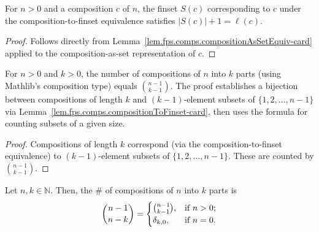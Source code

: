 \begin{lemma}
\label{lem.fps.comps.compositionToFinset-card}
\leanhelper
\leanok
For $n > 0$ and a composition $c$ of $n$, the finset $S(c)$ corresponding to $c$
under the composition-to-finset equivalence satisfies
$|S(c)| + 1 = \ell(c)$.
\end{lemma}

\begin{proof}
\leanok
Follows directly from Lemma~\ref{lem.fps.comps.compositionAsSetEquiv-card}
applied to the composition-as-set representation of $c$.
\end{proof}

\begin{lemma}
\label{lem.fps.comps.card-compositions-of-length}
\leanhelper
\leanok
For $n > 0$ and $k > 0$, the number of compositions of $n$ into $k$ parts
(using Mathlib's composition type) equals $\binom{n-1}{k-1}$.
The proof establishes a bijection between compositions of length $k$
and $(k-1)$-element subsets of $\{1, 2, \ldots, n-1\}$ via
Lemma~\ref{lem.fps.comps.compositionToFinset-card}, then uses
the formula for counting subsets of a given size.
\end{lemma}

\begin{proof}
Compositions of length $k$ correspond (via the composition-to-finset equivalence) to
$(k-1)$-element subsets of $\{1, 2, \ldots, n-1\}$.
These are counted by $\binom{n-1}{k-1}$.
\end{proof}

\begin{theorem}
\label{thm.fps.comps.num-comps-n-k}
\leantarget
\leanok
Let $n,k\in\mathbb{N}$. Then, the \# of
compositions of $n$ into $k$ parts is%
\[
\dbinom{n-1}{n-k}=%
\begin{cases}
\dbinom{n-1}{k-1}, & \text{if }n>0;\\
\delta_{k,0}, & \text{if }n=0.
\end{cases}
\]
\end{theorem}

